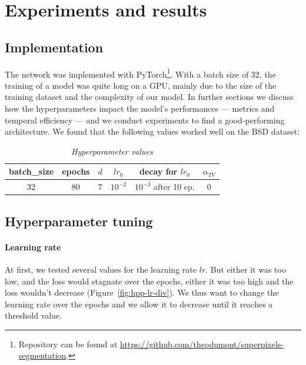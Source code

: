 \documentclass{article}
\begin{document}
\section{Experiments and results\label{s4}}

    \subsection{Implementation}
        The network was implemented with PyTorch\footnote{Repository can be found at \url{https://github.com/theodumont/superpixels-segmentation}.}. With a batch size of 32, the training of a model was quite long on a GPU, mainly due to the size of the training dataset and the complexity of our model. In further sections we discuss how the hyperparameters impact the model's performances --- metrics and temporal efficiency --- and we conduct experiments to find a good-performing architecture. We found that the following values worked well on the BSD dataset:
        \begin{table}[!ht]
            \centering
            \begin{tabular}{|c|c|c|c|c|c|}
                \hline
                batch\_size & epochs & $d$ & $lr_0$ & decay for $lr_0$ & $\alpha_{TV}$ \\
                \hline
                \hline
                32 & 80 & $7$ & $10^{-2}$ & $10^{-3}$ after 10 ep. & 0 \\
                \hline
            \end{tabular}
            \caption{\textit{Hyperparameter values}}
        \end{table}


    \subsection{Hyperparameter tuning}
        \paragraph{Learning rate}
        At first, we tested several values for the learning rate $lr$. But either it was too low, and the loss would stagnate over the epochs, either it was too high and the loss wouldn't decrease (Figure~\ref{fig:hpp-lr-div}). We thus want to change the learning rate over the epochs and we allow it to decrease until it reaches a threshold value.
\end{document}
